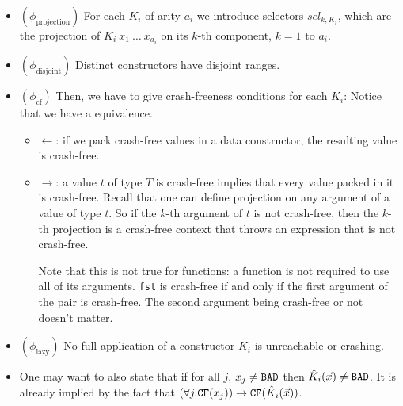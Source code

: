\documentclass[preprint]{sigplanconf}
\begin{document}
\begin{itemize}
\item $(\phi_\text{projection})$ For each $K_i$ of arity $a_i$ we introduce selectors
  $sel_{k,K_i}$, which are the projection of $K_i~x_1~\dots~x_{a_i}$
  on its $k$-th component, $k = 1\text{ to }a_i$.
\item $(\phi_\text{disjoint})$ Distinct constructors have disjoint ranges.
\item $(\phi_\text{cf})$ Then, we have to give crash-freeness conditions for each $K_i$:
  Notice that we have a equivalence.
  \begin{itemize}
  \item $\gets$: if we pack crash-free values in a data constructor,
    the resulting value is crash-free. 
  \item $\to$: a value $t$ of type $T$ is crash-free implies
    that every value packed in it is crash-free. Recall that one can
    define projection on any argument of a value of type $t$. So if
    the $k$-th argument of $t$ is not crash-free, then the $k$-th
    projection is a crash-free context that throws an expression that
    is not crash-free. 

  Note that this is not true for functions: a function is not required
  to use all of its arguments. \texttt{fst} is crash-free if and only
  if the first argument of the pair is crash-free. The second argument
  being crash-free or not doesn't matter.

  \end{itemize}

\item $(\phi_\text{lazy})$ No full application of a constructor $K_i$ is unreachable or crashing.
\item One may want to also state that if for all $j$, $x_j \neq \texttt{BAD}$ then
  $\hat{K}_i(\vec{x}) \neq \texttt{BAD}$. It is already implied by the fact that
  $\left(\forall j. \texttt{CF}(x_j)\right) \to \texttt{CF}(\hat{K}_i(\vec{x}))$.
\end{itemize}
\end{document}
